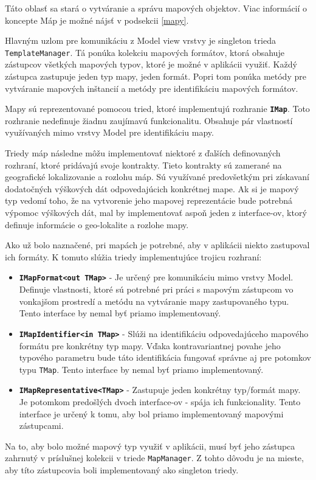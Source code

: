 Táto oblasť sa stará o vytváranie a správu mapových objektov. Viac informácií o koncepte Máp je možné nájsť v podsekcii \ref{mapy}.

Hlavným uzlom pre komunikáciu z Model view vrstvy je singleton trieda \texttt{TemplateManager}. Tá ponúka kolekciu mapových formátov, ktorá obsahuje zástupcov všetkých mapových typov, ktoré je možné v aplikácii využiť. Každý zástupca zastupuje jeden typ mapy, jeden formát. Popri tom ponúka metódy pre vytváranie mapových inštancií a metódy pre identifikáciu mapových formátov. 

\bigskip

Mapy sú reprezentované pomocou tried, ktoré implementujú rozhranie \textbf{\texttt{IMap}}. Toto rozhranie nedefinuje žiadnu zaujímavú funkcionalitu. Obsahuje pár vlastností využívaných mimo vrstvy Model pre identifikáciu mapy.

Triedy máp následne môžu implementovať niektoré z ďalších definovaných rozhraní, ktoré pridávajú svoje kontrakty. Tieto kontrakty sú zamerané na geografické lokalizovanie a rozlohu máp. Sú využívané predovšetkým pri získavaní dodatočných výškových dát odpovedajúcich konkrétnej mape. Ak si je mapový typ vedomí toho, že na vytvorenie jeho mapovej reprezentácie bude potrebná výpomoc výškových dát, mal by implementovať aspoň jeden z interface-ov, ktorý definuje informácie o geo-lokalite a rozlohe mapy.

Ako už bolo naznačené, pri mapách je potrebné, aby v aplikácii niekto zastupoval ich formáty. K tomuto slúžia triedy implementujúce trojicu rozhraní:
\begin{itemize}
    \item \textbf{\texttt{IMapFormat<out TMap>}} - Je určený pre komunikáciu mimo vrstvy Model. Definuje vlastnosti, ktoré sú potrebné pri práci s mapovým zástupcom vo vonkajšom prostredí a metódu na vytváranie mapy zastupovaného typu. Tento interface by nemal byť priamo implementovaný.
    \item \textbf{\texttt{IMapIdentifier<in TMap>}} - Slúži na identifikáciu odpovedajúceho mapového formátu pre konkrétny typ mapy. Vďaka kontravariantnej povahe jeho typového parametru bude táto identifikácia fungovať správne aj pre potomkov typu \texttt{TMap}. Tento interface by nemal byť priamo implementovaný.
    \item \textbf{\texttt{IMapRepresentative<TMap>}} - Zastupuje jeden konkrétny typ/formát mapy. Je potomkom predošlých dvoch interface-ov - spája ich funkcionality. Tento interface je určený k tomu, aby bol priamo implementovaný mapovými zástupcami.   
\end{itemize}
Na to, aby bolo možné mapový typ využiť v aplikácii, musí byť jeho zástupca zahrnutý v príslušnej kolekcii v triede \texttt{MapManager}. Z tohto dôvodu je na mieste, aby títo zástupcovia boli implementovaný ako singleton triedy.

